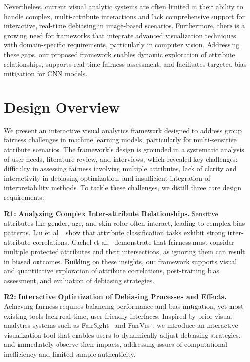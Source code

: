 \documentclass[sigconf]{acmart}
\newcommand{\REVISE}[1]{#1}
\begin{document}
 
Nevertheless, current visual analytic systems are often limited in their ability to handle complex, multi-attribute interactions and lack comprehensive support for interactive, real-time debiasing in image-based scenarios. Furthermore, there is a growing need for frameworks that integrate advanced visualization techniques with domain-specific requirements, particularly in computer vision. Addressing these gaps, our proposed framework enables dynamic exploration of attribute relationships, supports real-time fairness assessment, and facilitates targeted bias mitigation for CNN models.






\section{Design Overview}

We present an interactive visual analytics framework designed to address group fairness challenges in machine learning models, particularly for multi-sensitive attribute scenarios. The framework’s design is grounded in a systematic analysis of user needs, literature review, and interviews, which revealed key challenges: difficulty in assessing fairness involving multiple attributes, lack of clarity and interactivity in debiasing optimization, and insufficient integration of interpretability methods. To tackle these challenges, we distill three core design requirements:

\REVISE{
\textbf{R1: Analyzing Complex Inter-attribute Relationships.} Sensitive attributes like gender, age, and skin color often interact, leading to complex bias patterns. Liu et al.~\cite{liu2023facial} show that attribute classification tasks exhibit strong inter-attribute correlations. Cachel et al.~\cite{DBLP:conf/icde/CachelRH22} demonstrate that fairness must consider multiple protected attributes and their intersections, as ignoring them can result in biased outcomes. Building on these insights, our framework supports visual and quantitative exploration of attribute correlations, post-training bias assessment, and evaluation of debiasing strategies.}

\REVISE{
\textbf{R2: Interactive Optimization of Debiasing Processes and Effects.} Achieving fairness requires balancing performance and bias mitigation, yet most existing tools lack real-time, user-friendly interfaces. Inspired by prior visual analytics systems such as FairSight~\cite{DBLP:journals/tvcg/AhnL20} and FairVis~\cite{DBLP:conf/ieeevast/CabreraEHKMC19}, we introduce an interactive visualization tool that enables users to dynamically adjust debiasing strategies, and immediately observe their impacts, addressing issues of computational inefficiency and limited sample authenticity. }
\end{document}
